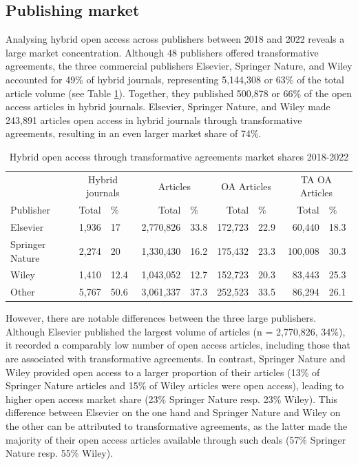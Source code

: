 \documentclass[a4paper,man,floatsintext,longtable,noextraspace,12pt]{apa6}
\begin{document}
\subsection{Publishing market}\label{publishing-market}

Analysing hybrid open access across publishers between 2018 and 2022
reveals a large market concentration. Although 48 publishers offered
transformative agreements, the three commercial publishers Elsevier,
Springer Nature, and Wiley accounted for 49\% of hybrid journals,
representing 5,144,308 or 63\% of the total article volume (see Table
\ref{tab:publisher_league_table}). Together, they published 500,878 or
66\% of the open access articles in hybrid journals. Elsevier, Springer
Nature, and Wiley made 243,891 articles open access in hybrid journals
through transformative agreements, resulting in an even larger market
share of 74\%.

\begin{table}[H]

\caption{\label{tab:publisher_league_table}Hybrid open access through transformative agreements market shares 2018-2022}
\centering
\begin{tabular}[t]{lrlrlrlrl}
\toprule
\multicolumn{1}{c}{ } & \multicolumn{2}{c}{Hybrid journals} & \multicolumn{2}{c}{Articles} & \multicolumn{2}{c}{OA Articles} & \multicolumn{2}{c}{TA OA Articles} \\
\cmidrule(l{3pt}r{3pt}){2-3} \cmidrule(l{3pt}r{3pt}){4-5} \cmidrule(l{3pt}r{3pt}){6-7} \cmidrule(l{3pt}r{3pt}){8-9}
Publisher & Total & \% & Total & \% & Total & \% & Total & \%\\
\midrule
Elsevier & 1,936 & 17 & 2,770,826 & 33.8 & 172,723 & 22.9 & 60,440 & 18.3\\
Springer Nature & 2,274 & 20 & 1,330,430 & 16.2 & 175,432 & 23.3 & 100,008 & 30.3\\
Wiley & 1,410 & 12.4 & 1,043,052 & 12.7 & 152,723 & 20.3 & 83,443 & 25.3\\
Other & 5,767 & 50.6 & 3,061,337 & 37.3 & 252,523 & 33.5 & 86,294 & 26.1\\
\bottomrule
\end{tabular}
\end{table}

However, there are notable differences between the three large
publishers. Although Elsevier published the largest volume of articles
(n = 2,770,826, 34\%), it recorded a comparably low number of open
access articles, including those that are associated with transformative
agreements. In contrast, Springer Nature and Wiley provided open access
to a larger proportion of their articles (13\% of Springer Nature
articles and 15\% of Wiley articles were open access), leading to higher
open access market share (23\% Springer Nature resp. 23\% Wiley). This
difference between Elsevier on the one hand and Springer Nature and
Wiley on the other can be attributed to transformative agreements, as
the latter made the majority of their open access articles available
through such deals (57\% Springer Nature resp. 55\% Wiley).
\end{document}
